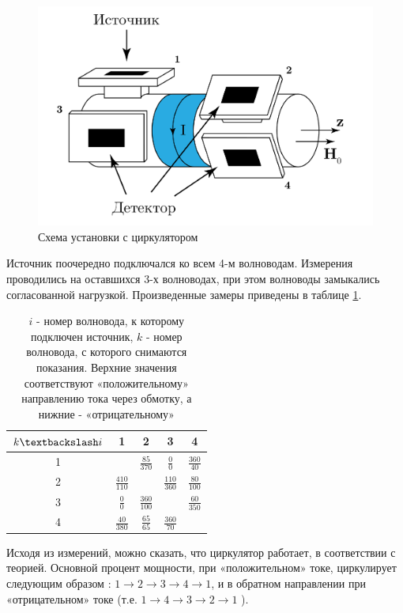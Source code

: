 \begin{figure}[h!]
    \centering
    \includegraphics[width = 0.6\linewidth]{imgs/circulator2.pdf}
    \caption{Схема установки с циркулятором}
    \label{fig:exp:circulator2}
\end{figure}

Источник поочередно подключался ко всем 4-м волноводам. Измерения проводились
на оставшихся 3-х волноводах, при этом волноводы замыкались согласованной
нагрузкой. Произведенные замеры приведены в таблице \ref{tab:faradey}.
 \begin{table}[h!]
    \centering
    \begin{tabular}{|c|c|c|c|c|}
    \hline
     $k \textbackslash i$ & 1 & 2 & 3 & 4 \\ \hline
    1 & \cellcolor{black!70}  & $\frac{85}{370}$ & $\frac{0}{0}$& $\frac{360}{40}$  \\ \hline
    2 & $\frac{410}{110}$  &\cellcolor{black!70}   & $\frac{110}{360}$  & $\frac{80}{100}$  \\ \hline
    3 & $\frac{0}{0}$  & $\frac{360}{100}$  & \cellcolor{black!70}  &  $\frac{60}{350}$ \\ \hline
    4 & $\frac{40}{380}$  & $\frac{65}{65}$  & $\frac{360}{70}$  & \cellcolor{black!70} \\ \hline
    \end{tabular}
    \caption{$i$ - номер волновода, к которому подключен источник, $k$ - номер волновода, с которого снимаются
    показания. Верхние значения соответствуют «положительному» направлению тока через обмотку, а нижние - «отрицательному»}
    \label{tab:faradey}
    \end{table}

Исходя из измерений, можно сказать, что циркулятор работает, в соответствии с теорией. Основной процент мощности, при
«положительном» токе, циркулирует следующим образом : $1 \rightarrow 2 \rightarrow 3 \rightarrow 4 \rightarrow 1$, и
в обратном направлении при «отрицательном» токе (т.е. $1 \rightarrow 4 \rightarrow 3 \rightarrow 2 \rightarrow 1$ ).

